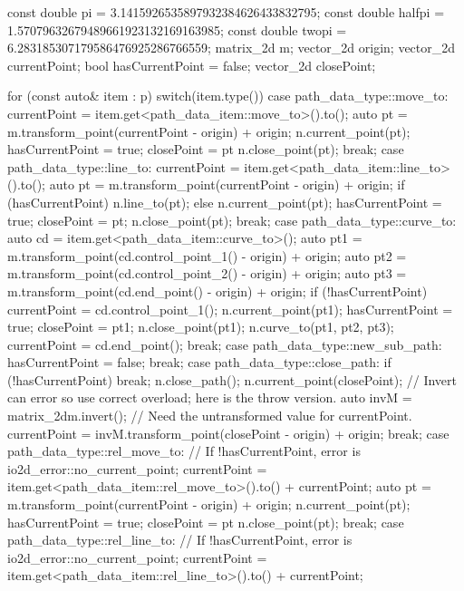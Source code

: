 \begin{codeblock}
const double pi =     3.1415926535897932384626433832795;
const double halfpi = 1.57079632679489661923132169163985;
const double twopi =  6.283185307179586476925286766559;
matrix_2d m;
vector_2d origin;
vector_2d currentPoint;
bool hasCurrentPoint = false;
vector_2d closePoint;

for (const auto& item : p) {
  switch(item.type()) {
  case path_data_type::move_to:
  {
    currentPoint = item.get<path_data_item::move_to>().to();
    auto pt = m.transform_point(currentPoint - origin) + origin;
    n.current_point(pt);
    hasCurrentPoint = true;
    closePoint = pt
    n.close_point(pt);
  } break;
  case path_data_type::line_to:
  {
    currentPoint = item.get<path_data_item::line_to>().to();
    auto pt = m.transform_point(currentPoint - origin) + origin;
    if (hasCurrentPoint) {
      n.line_to(pt);
    }
    else {
      n.current_point(pt);
      hasCurrentPoint = true;
      closePoint = pt;
      n.close_point(pt);
    }
  } break;
  case path_data_type::curve_to:
  {
    auto cd = item.get<path_data_item::curve_to>();
    auto pt1 = m.transform_point(cd.control_point_1() - origin) + origin;
    auto pt2 = m.transform_point(cd.control_point_2() - origin) + origin;
    auto pt3 = m.transform_point(cd.end_point() - origin) + origin;
    if (!hasCurrentPoint) {
      currentPoint = cd.control_point_1();
      n.current_point(pt1);
      hasCurrentPoint = true;
      closePoint = pt1;
      n.close_point(pt1);
    }
    n.curve_to(pt1, pt2, pt3);
    currentPoint = cd.end_point();
  } break;
  case path_data_type::new_sub_path:
  {
    hasCurrentPoint = false;
  } break;
  case path_data_type::close_path:
  {
    if (!hasCurrentPoint) {
      break;
    }
    n.close_path();
    n.current_point(closePoint);
    // Invert can error so use correct overload; here is the throw version.
    auto invM = matrix_2d{m}.invert();
    // Need the untransformed value for currentPoint.
    currentPoint = invM.transform_point(closePoint - origin) + origin;
  } break;
  case path_data_type::rel_move_to:
  {
    // If !hasCurrentPoint, error is io2d_error::no_current_point;
    currentPoint = item.get<path_data_item::rel_move_to>().to() + currentPoint;
    auto pt = m.transform_point(currentPoint - origin) + origin;
    n.current_point(pt);
    hasCurrentPoint = true;
    closePoint = pt    
    n.close_point(pt);
  } break;
  case path_data_type::rel_line_to:
  {
    // If !hasCurrentPoint, error is io2d_error::no_current_point;
    currentPoint = item.get<path_data_item::rel_line_to>().to() + currentPoint;
}}}
\end{codeblock}
